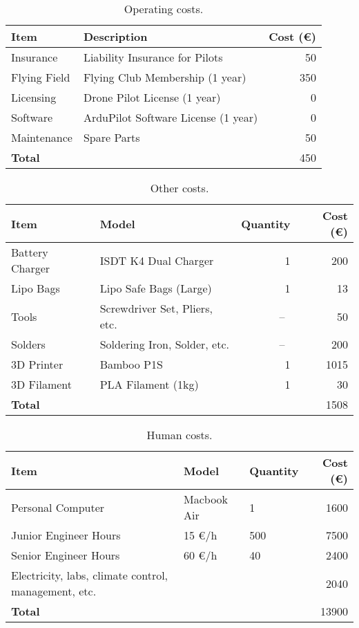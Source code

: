 \begin{table}[H]
    \begin{tabular}{ l l r }
        \toprule
        \textbf{Item} & \textbf{Description} & \textbf{Cost (\euro)} \\
        \midrule
        Insurance & Liability Insurance for Pilots & 50 \\
        Flying Field & Flying Club Membership (1 year) & 350 \\
        Licensing & Drone Pilot License (1 year) & 0 \\
        Software & ArduPilot Software License (1 year) & 0 \\
        Maintenance & Spare Parts & 50 \\
        \midrule
        \textbf{Total} & & 450 \\
        \bottomrule
    \end{tabular}
    \caption{Operating costs.}\label{tab:operating_costs}
\end{table}

\begin{table}[H]
    \begin{tabular}{ l l r r }
        \toprule
        \textbf{Item} & \textbf{Model} & \textbf{Quantity} & \textbf{Cost (\euro)} \\
        \midrule
        Battery Charger & ISDT K4 Dual Charger \autocite{rcinnovationsISDTCargador} & 1 & 200 \\
        Lipo Bags & Lipo Safe Bags (Large) \autocite{rcinnovationsBolsaProtectora} & 1 & 13 \\
        Tools & Screwdriver Set, Pliers, etc. &~--~& 50 \\
        Solders & Soldering Iron, Solder, etc. &~--~& 200 \\
        3D Printer & Bamboo P1S \autocite{bambulabBambuPrinter} & 1 & 1015 \\
        3D Filament & PLA Filament (1kg) & 1 & 30 \\
        \midrule
        \textbf{Total} & & & 1508 \\
        \bottomrule
    \end{tabular}
    \caption{Other costs.}\label{tab:other_costs}
\end{table}

\begin{table}[H]
    \begin{tabular}{ l l l r }
        \toprule
		\textbf{Item}  & \textbf{Model}                           & \textbf{Quantity} & \textbf{Cost (\euro)} \\
        \midrule
        Personal Computer & Macbook Air & 1 & 1600  \\
        Junior Engineer Hours & 15 \euro/h & 500 & 7500 \\
        Senior Engineer Hours & 60 \euro/h & 40 & 2400 \\
        Electricity, labs, climate control, management, etc. & & & 2040 \\
        \midrule
        \textbf{Total} & & & 13900 \\
        \bottomrule
    \end{tabular}
    \caption{Human costs.}\label{tab:human_costs}
\end{table}
